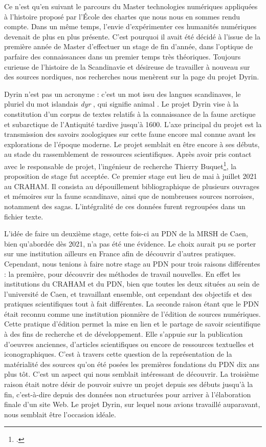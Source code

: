 \documentclass[a4paper,12pt,twoside]{book}
\begin{document}
Ce n'est qu'en suivant le parcours du Master technologies numériques appliquées à l'histoire proposé par l'École des chartes que nous nous en sommes rendu compte. Dans un même temps, l'envie d'expérimenter ces humanités numériques devenait de plus en plus présente. C'est pourquoi il avait été décidé à l'issue de la première année de Master d'effectuer un stage de fin d'année, dans l'optique de parfaire des connaissances dans un premier temps très théoriques. Toujours curieuse de l'histoire de la Scandinavie et désireuse de travailler à nouveau sur des sources nordiques, nos recherches nous menèrent sur la page du projet Dyrin.

Dyrin n'est pas un acronyme : c'est un mot issu des langues scandinaves, le pluriel du mot islandais \og \textit{dyr} \fg, qui signifie \og animal \fg. Le projet Dyrin vise à la constitution d'un corpus de textes relatifs à la connaissance de la faune arctique et subarctique de l'Antiquité tardive jusqu'à 1600. L'axe principal du projet est la transmission des savoirs zoologiques sur cette faune encore mal connue avant les explorations de l'époque moderne. Le projet semblait en être encore à ses débuts, au stade du rassemblement de ressources scientifiques.
Après avoir pris contact avec le responsable de projet, l'ingénieur de recherche Thierry Buquet\footcite{buquet_thierry}, la proposition de stage fut acceptée. Ce premier stage eut lieu de mai à juillet 2021 au \acrfull{CRAHAM}. Il consista au dépouillement bibliographique de plusieurs ouvrages et mémoires sur la faune scandinave, ainsi que de nombreuses sources norroises, notamment des sagas. L'intégralité de ces données furent regroupées dans un fichier texte.

L'idée de faire un deuxième stage, cette fois-ci au \acrlong{PDN} de la \acrlong{MRSH} de Caen, bien qu'abordée dès 2021, n'a pas été une évidence. Le choix aurait pu se porter sur une institution ailleurs en France afin de découvrir d'autres pratiques. Cependant, nous tenions à faire notre stage au \acrshort{PDN} pour trois raisons différentes : la première, pour découvrir des méthodes de travail nouvelles. En effet les institutions du \acrshort{CRAHAM} et du \acrshort{PDN}, bien que toutes les deux situées au sein de l'université de Caen, et travaillant ensemble, ont cependant des objectifs et des pratiques scientifiques tout à fait différentes. La seconde raison étant que le \acrshort{PDN} était reconnu comme une institution pionnière de l'édition de sources numériques. Cette pratique d'édition permet la mise en lien et le partage de savoir scientifique à des fins de recherche et de développement. Elle s'appuie sur la publication d'oeuvres anciennes, d'articles scientifiques ou encore de ressources textuelles et iconographiques. C'est à travers cette question de la représentation de la matérialité des sources qu'on été posées les premières fondations du \acrshort{PDN} dix ans plus tôt. C'est un aspect qui nous semblait intéressant de découvrir. La troisième raison était notre désir de pouvoir suivre un projet depuis ses débuts jusqu'à la fin, c'est-à-dire depuis des données non structurées pour arriver à l'élaboration finale d'un site Web. Le projet Dyrin, sur lequel nous avions travaillé auparavant, nous semblait être l'occasion idéale.
\end{document}
